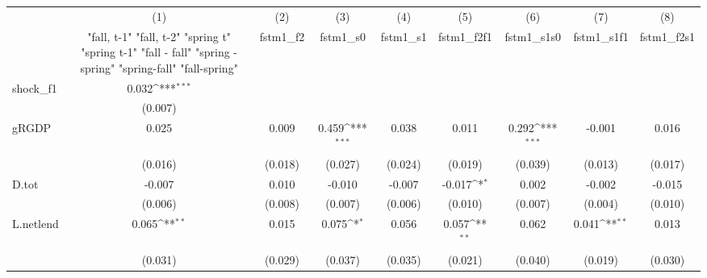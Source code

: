 {
\def\sym#1{\ifmmode^{#1}\else\(^{#1}\)\fi}
\begin{tabular}{l*{8}{c}}
\toprule
            &\multicolumn{1}{c}{(1)}&\multicolumn{1}{c}{(2)}&\multicolumn{1}{c}{(3)}&\multicolumn{1}{c}{(4)}&\multicolumn{1}{c}{(5)}&\multicolumn{1}{c}{(6)}&\multicolumn{1}{c}{(7)}&\multicolumn{1}{c}{(8)}\\
            &\multicolumn{1}{c}{  "fall, t-1" "fall, t-2" "spring t" "spring t-1"  "fall - fall" "spring - spring" "spring-fall" "fall-spring" }&\multicolumn{1}{c}{fstm1\_f2}&\multicolumn{1}{c}{fstm1\_s0}&\multicolumn{1}{c}{fstm1\_s1}&\multicolumn{1}{c}{fstm1\_f2f1}&\multicolumn{1}{c}{fstm1\_s1s0}&\multicolumn{1}{c}{fstm1\_s1f1}&\multicolumn{1}{c}{fstm1\_f2s1}\\
\midrule
shock\_f1    &       0.032\sym{***}&                     &                     &                     &                     &                     &                     &                     \\
            &     (0.007)         &                     &                     &                     &                     &                     &                     &                     \\
\addlinespace
gRGDP       &       0.025         &       0.009         &       0.459\sym{***}&       0.038         &       0.011         &       0.292\sym{***}&      -0.001         &       0.016         \\
            &     (0.016)         &     (0.018)         &     (0.027)         &     (0.024)         &     (0.019)         &     (0.039)         &     (0.013)         &     (0.017)         \\
\addlinespace
D.tot       &      -0.007         &       0.010         &      -0.010         &      -0.007         &      -0.017\sym{*}  &       0.002         &      -0.002         &      -0.015         \\
            &     (0.006)         &     (0.008)         &     (0.007)         &     (0.006)         &     (0.010)         &     (0.007)         &     (0.004)         &     (0.010)         \\
\addlinespace
L.netlend   &       0.065\sym{**} &       0.015         &       0.075\sym{*}  &       0.056         &       0.057\sym{**} &       0.062         &       0.041\sym{**} &       0.013         \\
            &     (0.031)         &     (0.029)         &     (0.037)         &     (0.035)         &     (0.021)         &     (0.040)         &     (0.019)         &     (0.030)         \\

\end{tabular}}
